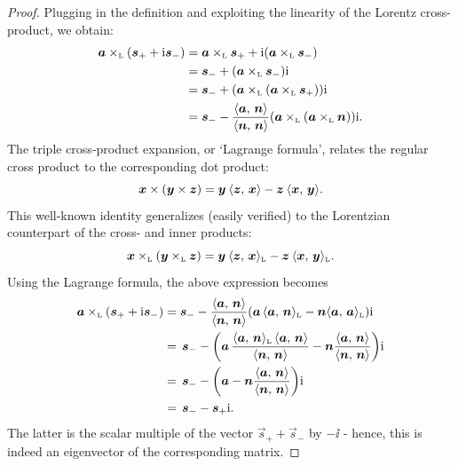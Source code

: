 \begin{proof}
    Plugging in the definition and exploiting the linearity of the Lorentz cross-product, we obtain:
    \begin{equation*}
        \begin{split}
            \lorcrossp{\vec{a}}{\qty(\vec{s}_+ + \ii\vec{s}_-)} 
            &= \lorcrossp{\vec{a}}{\vec{s}_+} +
        \ii\qty(\lorcrossp{\vec{a}}{\vec{s}_-}) \\
            &= \vec{s}_- + \qty(\lorcrossp{\vec{a}}{\vec{s}_-})\ii \\ 
            &=\vec{s}_- +  \qty(\lorcrossp{\vec{a}}{\qty(\lorcrossp{\vec{a}}{\vec{s}_+})})\ii \\
            &=\vec{s}_- -  \frac{ \inner{\vec{a}}{\vec{n}}}{ \inner{\vec{n}}{\vec{n}} }\qty(\lorcrossp{\vec{a}}{\qty(\lorcrossp{\vec{a}}{\vec{n}})})\ii.  \\
        \end{split}
    \end{equation*}
The triple cross-product expansion, or `Lagrange formula', relates the regular cross product to the corresponding dot product:
    \begin{equation}
     \vec{x}\times\qty(\vec{y}\times\vec{z}) = \vec{y}\:\inner{\vec{z}}{\vec{x}} - \vec{z}\:\inner{\vec{x}}{\vec{y}}.
\end{equation}
This well-known identity generalizes (easily verified) to the Lorentzian counterpart of the cross- and inner products:
\begin{equation}
     \lorcrossp{\vec{x}}{\qty(\lorcrossp{\vec{y}}{\vec{z}})} 
   = \vec{y}\:\lorinner{\vec{z}}{\vec{x}} - \vec{z}\:\lorinner{\vec{x}}{\vec{y}}.
\end{equation}
Using the Lagrange formula, the above expression becomes
    \begin{equation*}
        \begin{split}
            \lorcrossp{\vec{a}}{\qty(\vec{s}_+ + \ii\vec{s}_-)} &= 
                \vec{s}_- - \frac{ \inner{\vec{a}}{\vec{n}} }{ \inner{\vec{n}}{\vec{n}} }\qty(\vec{a}\,\lorinner{\vec{a}}{\vec{n}} - \vec{n}\lorinner{\vec{a}}{\vec{a}})\ii \\
                & =\, \vec{s}_- - \qty(\vec{a}\,\frac{ \lorinner{\vec{a}}{\vec{n}} \, \inner{\vec{a}}{\vec{n}} }{ \inner{\vec{n}}{\vec{n}} } - \vec{n}\frac{ \inner{\vec{a}}{\vec{n}} }{ \inner{\vec{n}}{\vec{n}} })\ii \\
                & =\, \vec{s}_- - \qty(\vec{a} - \vec{n}\frac{ \inner{\vec{a}}{\vec{n}} }{ \inner{\vec{n}}{\vec{n}} })\ii \\
                & =\, \vec{s}_- - \vec{s}_+\ii. 
        \end{split}
    \end{equation*}
    The latter is the scalar multiple of the vector \(\vec{s}_+ + \vec{s}_-\) by \(-\ii\) - hence, this is indeed an eigenvector of the corresponding matrix.
\end{proof}

